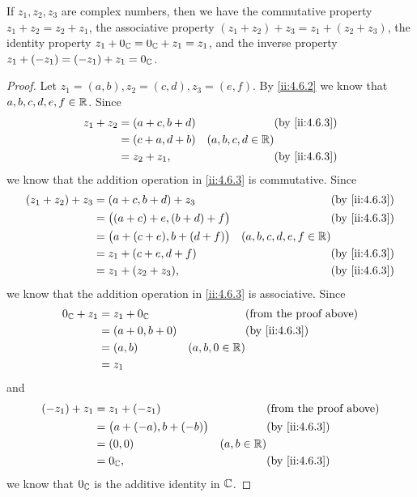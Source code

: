\begin{lem}\label{ii:4.6.4}
  If \(z_1, z_2, z_3\) are complex numbers, then we have the commutative property \(z_1 + z_2 = z_2 + z_1\), the associative property \((z_1 + z_2) + z_3 = z_1 + (z_2 + z_3)\), the identity property \(z_1 + 0_{\mathbb{C}} = 0_{\mathbb{C}} + z_1 = z_1\), and the inverse property \(z_1 + (-z_1) = (-z_1) + z_1 = 0_{\mathbb{C}}\).
\end{lem}

\begin{proof}
  Let \(z_1 = (a, b), z_2 = (c, d), z_3 = (e, f)\).
  By \cref{ii:4.6.2} we know that \(a, b, c, d, e, f \in \mathbb{R}\).
  Since
  \begin{align*}
    z_1 + z_2 & = (a + c, b + d) &                     & \by{ii:4.6.3} \\
              & = (c + a, d + b) & (a, b, c, d \in \R)                 \\
              & = z_2 + z_1,     &                     & \by{ii:4.6.3}
  \end{align*}
  we know that the addition operation in \cref{ii:4.6.3} is commutative.
  Since
  \begin{align*}
    (z_1 + z_2) + z_3 & = (a + c, b + d) + z_3               &                           & \by{ii:4.6.3} \\
                      & = \big((a + c) + e, (b + d) + f\big) &                           & \by{ii:4.6.3} \\
                      & = \big(a + (c + e), b + (d + f)\big) & (a, b, c, d, e, f \in \R)                 \\
                      & = z_1 + (c + e, d + f)               &                           & \by{ii:4.6.3} \\
                      & = z_1 + (z_2 + z_3),                 &                           & \by{ii:4.6.3}
  \end{align*}
  we know that the addition operation in \cref{ii:4.6.3} is associative.
  Since
  \begin{align*}
    0_{\C} + z_1 & = z_1 + 0_{\C}   &                  & \text{(from the proof above)} \\
                 & = (a + 0, b + 0) &                  & \by{ii:4.6.3}                 \\
                 & = (a, b)         & (a, b, 0 \in \R)                                 \\
                 & = z_1
  \end{align*}
  and
  \begin{align*}
    (-z_1) + z_1 & = z_1 + (-z_1)                 &               & \text{(from the proof above)} \\
                 & = \big(a + (-a), b + (-b)\big) &               & \by{ii:4.6.3}                 \\
                 & = (0, 0)                       & (a, b \in \R)                                 \\
                 & = 0_{\C},                      &               & \by{ii:4.6.3}
  \end{align*}
  we know that \(0_{\mathbb{C}}\) is the additive identity in \(\mathbb{C}\).
\end{proof}

